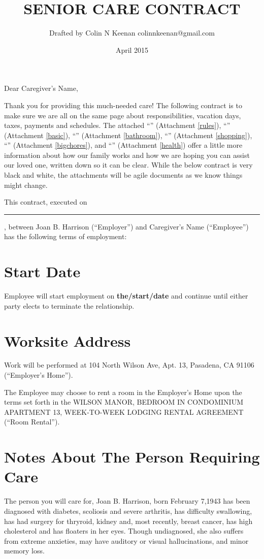 \documentclass[]{article}
\newcommand{\mytitle}{SENIOR CARE CONTRACT}
\newcommand{\agreementtitle}{WILSON MANOR, BEDROOM IN CONDOMINIUM APARTMENT 13, WEEK-TO-WEEK LODGING RENTAL AGREEMENT}
\newcommand{\startdate}{the/start/date}
\newcommand{\datefillin}{\hspace{0.2cm}\rule{3cm}{.1pt}}
\newcommand{\lname}{Caregiver's Name}
\newcommand{\mom}{Joan B. Harrison}
\begin{document}
\title{\mytitle{}}
\author{Drafted by Colin N Keenan colinnkeenan@gmail.com}
\date{April 2015}
\maketitle
\thispagestyle{fancy}

\noindent \hrulefill

Dear \lname{},

Thank you for providing this much-needed care! The following contract is to make sure we are all on the same page about responsibilities, vacation days, taxes, payments and schedules. The attached ``'' (Attachment \ref{rules}), ``\basic{}'' (Attachment \ref{basic}), ``\bathroom{}'' (Attachment \ref{bathroom}), ``\shopping{}'' (Attachment \ref{shopping}), ``\bigchores{}'' (Attachment \ref{bigchores}), and ``\health{}'' (Attachment \ref{health}) offer a little more information about how our family works and how we are hoping you can assist our loved one, written down so it can be clear. While the below contract is very black and white, the attachments will be agile documents as we know things might change.

This contract, executed on \datefillin{}, between \mom{} (``Employer'') and \lname{} (``Employee'') has the following terms of employment:

\section{Start Date}

Employee will start employment on \textbf{\startdate{}} and continue until either party elects to terminate the relationship.

\section{Worksite Address}

Work will be performed at 104 North Wilson Ave, Apt. 13, Pasadena, CA 91106 (``Employer's Home'').

The Employee may choose to rent a room in the Employer's Home upon the terms set forth in the \agreementtitle{} (``Room Rental'').

\section{Notes About The Person Requiring Care}

The person you will care for, \mom{}, born February 7,1943 has been diagnosed with diabetes, scoliosis and severe arthritis, has difficulty swallowing, has had surgery for thryroid, kidney and, most recently, breast cancer, has high cholesterol and has floaters in her eyes. Though undiagnosed, she also suffers from extreme anxieties, may have auditory or visual hallucinations, and minor memory loss.
\end{document}
